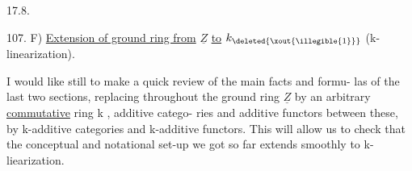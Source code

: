 17.8.

107. \quad F) \quad \uline{Extension of ground ring from} $\underline{Z}$ \uline{to} $k_{\deleted{\xout{\illegible{1}}}}$ (k-linearization).

I would like still to make a quick review of the main facts and formu-%
las of the last two sections, replacing throughout the ground ring $\underline{Z}$
by an arbitrary \uline{commutative} ring k ,   additive catego-%
ries  and additive functors between these, by k-additive categories and
k-additive functors. This will allow us to check that the conceptual and
notational set-up we got so far extends smoothly to k-liearization.

